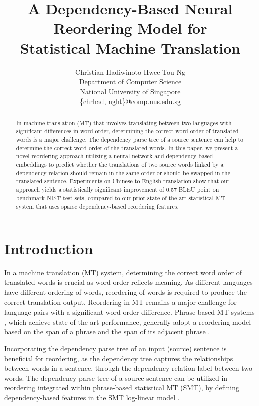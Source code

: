 \documentclass[letterpaper]{article}
\begin{document}
\title{A Dependency-Based Neural Reordering Model for \\Statistical Machine Translation}
\author{Christian Hadiwinoto \hspace{1cm} Hwee Tou Ng \\
Department of Computer Science \\
National University of Singapore \\
\{chrhad, nght\}@comp.nus.edu.sg\\
}
\maketitle
\begin{abstract}
In machine translation (MT) that involves translating between two languages with significant differences in word order, determining the correct word order of translated words is a major challenge. The dependency parse tree of a source sentence can help to determine the correct word order of the translated words.  In this paper, we present a novel reordering approach utilizing a neural network and dependency-based embeddings to predict whether the translations of two source words linked by a dependency relation should remain in the same order or should be swapped in the translated sentence. Experiments on Chinese-to-English translation show that our approach yields a statistically significant improvement of 0.57 BLEU point on benchmark NIST test sets, compared to our prior state-of-the-art statistical MT system that uses sparse dependency-based reordering features.
\end{abstract}

\section{Introduction}
In a machine translation (MT) system, determining the correct word order of translated words is crucial as word order reflects meaning. As different languages have different ordering of words, reordering of words is required to produce the correct translation output. Reordering in MT remains a major challenge for language pairs with a significant word order difference. Phrase-based MT systems \cite{koehn_statistical_2003}, which achieve state-of-the-art performance, generally adopt a reordering model based on the span of a phrase and the span of its adjacent phrase \cite{tillmann_unigram_2004,koehn_edinburgh_2005,galley_simple_2008}.

Incorporating the dependency parse tree of an input (source) sentence is beneficial for reordering, as the dependency tree captures the relationships between words in a sentence, through the dependency relation label between two words. The dependency parse tree of a source sentence can be utilized in reordering integrated within phrase-based statistical MT (SMT), by defining dependency-based features in the SMT log-linear model \cite{chang_discriminative_2009,hadiwinoto_swap_2016}.
\end{document}
